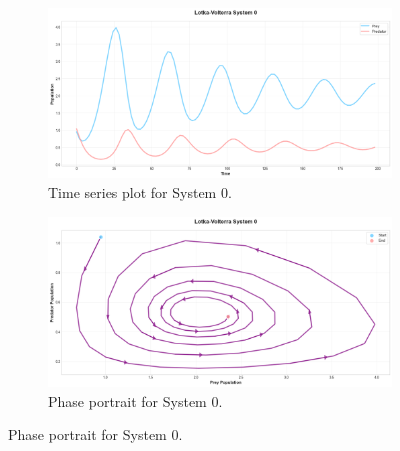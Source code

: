 \documentclass{article}
\begin{document}
\begin{figure}[!htbp] %
    \centering %

    \begin{subfigure}[b]{0.48\linewidth} %
        \centering
        \includegraphics[width=\linewidth]{M2 Course Work//Images/dataset_vis_timeseries_0.png}
        \caption{Time series plot for System 0.}
        \label{fig:ts_0}
    \end{subfigure}
    \hfill %
    \begin{subfigure}[b]{0.48\linewidth}
        \centering
        \includegraphics[width=\linewidth]{M2 Course Work//Images/dataset_vis_phase_0.png}
        \caption{Phase portrait for System 0.}
        \label{fig:phase_0}
    \end{subfigure}

    \vspace{0.3cm} %


\end{figure}
\end{document}
